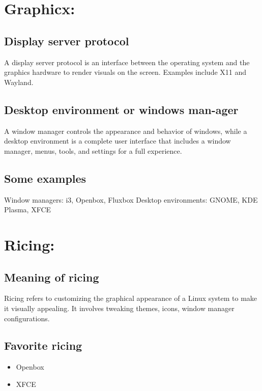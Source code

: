 \documentclass{article}
\begin{document}
\section*{Graphicx:}

\subsection*{Display server protocol}

A display server protocol is an interface between 
the operating system and the graphics hardware to 
render visuals on the screen. Examples include X11 and Wayland.
\subsection*{Desktop environment or windows man-ager}

A window manager controls the appearance and behavior 
of windows, while a desktop environment is a 
complete user interface that includes 
a window manager, menus, tools, and settings for 
a full experience.
\subsection*{Some examples}

Window managers: i3, Openbox, Fluxbox
Desktop environments: GNOME, KDE Plasma, XFCE




\section*{Ricing:}

\subsection*{Meaning of ricing}


Ricing refers to customizing 
the graphical appearance of a 
Linux system to make it visually appealing. 
It involves tweaking themes, icons, 
window manager configurations.
\subsection*{Favorite ricing}

\begin{itemize}
    \item Openbox
    \item XFCE 
\end{itemize}
\end{document}
